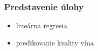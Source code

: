 \documentclass[presentation.tex]{subfiles}
\begin{document}
	
\begin{frame}

\frametitle{Predstavenie úlohy}
\begin{itemize}
	\item lineárna regresia
	\item predikovanie kvality vína
\end{itemize}


\end{frame}
	
\end{document}
